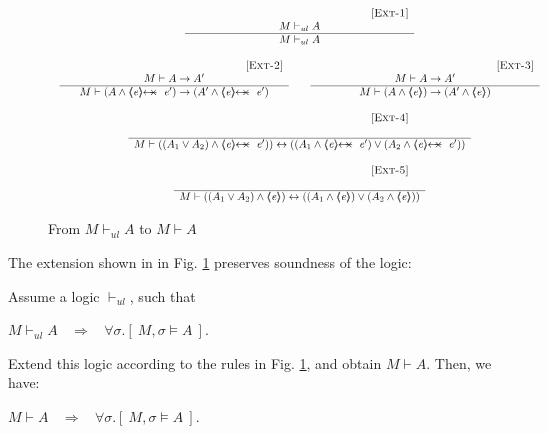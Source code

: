 \begin{figure}[htb]
$
\begin{array}{c}
\inferruleSD{[\sc{Ext-1}]}
	{  M \vdash_{ul} A  	}
	{ M \vdash_{ul} A   }
\\ \\
\begin{array}{lcl}
\inferruleSD{[\sc{Ext-2}]}
	{  
	M \vdash A \rightarrow A'
	 
	}
	{   M \vdash (A \wedge \protectedFrom {\re} {\re'}) \rightarrow (A' \wedge \protectedFrom {\re} {\re'})   }
& & 
\inferruleSD{[\sc{Ext-3}]}
	{   
	M \vdash A \rightarrow A'
	 
	}
	{   M \vdash (A \wedge \inside {\re} {) \rightarrow (A' \wedge \inside{\re}})   }
\end{array}
\\ \\
\inferruleSD{[\sc{Ext-4}]}
	{   
	\
	}
	{   M \vdash {((A_1 \vee A_2) \wedge \protectedFrom {\re} {\re'})) \leftrightarrow 
	                     ((A_1  \wedge  \protectedFrom {\re} {\re'})  \vee (A_2  \wedge \protectedFrom {\re} {\re'}))  }}
\\ \\
\inferruleSD{[\sc{Ext-5}]}
	{   \ 
	}
	{   M \vdash {((A_1 \vee A_2) \wedge \inside{\re}) \leftrightarrow 
	                     ((A_1  \wedge  \inside{\re})  \vee (A_2  \wedge  \inside{\re}))  }}
\end{array}
$
\caption{From $M \vdash_{ul} A$ to $M \vdash  A$}
\label{assert:logic:extend}
\end{figure}

\noindent
The extension shown in  in Fig.  \ref{assert:logic:extend}  preserves soundness of the logic:

\begin{lemma}
Assume a logic $\vdash_{ul}$, such that 
\begin{center}
$M \vdash_{ul} A   \ \ \ \  \Longrightarrow  \ \ \ \  \forall \sigma.[\ M, \sigma \models A\ ]$.\\
 \end{center}

\noindent
Extend this logic according to the rules in Fig.  \ref{assert:logic:extend}, and obtain $M \vdash  A$. Then, we have:
\begin{center}
$M \vdash A   \ \ \ \  \Longrightarrow  \ \ \ \  \forall \sigma.[\ M, \sigma \models A\ ]$.\\
 \end{center}

\end{lemma}

